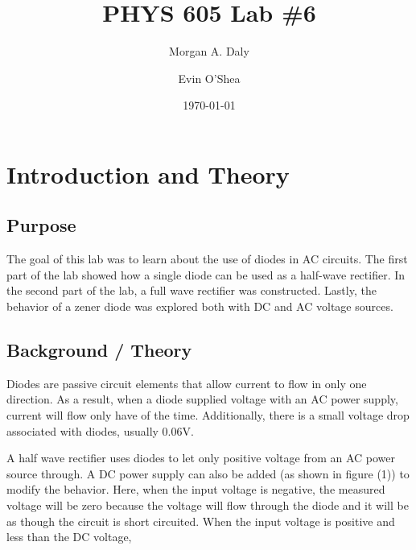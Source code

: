 \documentclass[twocolumn, amsmath]{revtex4}
\begin{document}
\title{PHYS 605 Lab \#6} 

\author{Morgan A. Daly}
\author{Evin O'Shea}
\date{\today} 


\maketitle


\section{Introduction and Theory}
\subsection{Purpose}

The goal of this lab was to learn about the use of diodes in AC circuits. The first part of the lab showed how a single diode can be used as a half-wave rectifier. In the second part of the lab, a full wave rectifier was constructed. Lastly, the behavior of a zener diode was explored both with DC and AC voltage sources.

\subsection{Background / Theory}

Diodes are passive circuit elements that allow current to flow in only one direction. As a result, when a diode supplied voltage with an AC power supply, current will flow only have of the time. Additionally, there is a small voltage drop associated with diodes, usually 0.06V.

A half wave rectifier uses diodes to let only positive voltage from an AC power source through. A DC power supply can also be added (as shown in figure (1)) to modify the behavior. Here, when the input voltage is negative, the measured voltage will be zero because the voltage will flow through the diode and it will be as though the circuit is short circuited. When the input voltage is positive and less than the DC voltage, %
\end{document}
